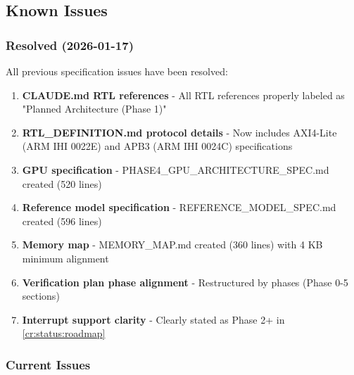 \subsection{Known Issues}\label{cr:status:phase-status:known-issues}

\subsubsection{\texorpdfstring{\ok{} Resolved
(2026-01-17)}{ Resolved (2026-01-17)}}\label{cr:status:phase-status:white-check-mark-resolved-2026-01-17}

\begin{record}

All previous specification issues have been resolved:

\begin{enumerate}
\def\labelenumi{\arabic{enumi}.}
\tightlist
\item
  \ok{} \textbf{CLAUDE.md RTL references} - All RTL references properly
  labeled as "Planned Architecture (Phase 1)"
\item
  \ok{} \textbf{RTL\_\allowbreak{}DEFINITION.md protocol details} - Now
  includes AXI4-Lite (ARM IHI 0022E) and APB3 (ARM IHI 0024C)
  specifications
\item
  \ok{} \textbf{GPU specification} -
  PHASE4\_\allowbreak{}GPU\_\allowbreak{}ARCHITECTURE\_\allowbreak{}SPEC.md
  created (520 lines)
\item
  \ok{} \textbf{Reference model specification} -
  REFERENCE\_\allowbreak{}MODEL\_\allowbreak{}SPEC.md created (596
  lines)
\item
  \ok{} \textbf{Memory map} - MEMORY\_\allowbreak{}MAP.md created (360
  lines) with 4 KB minimum alignment
\item
  \ok{} \textbf{Verification plan phase alignment} - Restructured by
  phases (Phase 0-5 sections)
\item
  \ok{} \textbf{Interrupt support clarity} - Clearly stated as Phase 2+
  in \cref{cr:status:roadmap}
\end{enumerate}

\end{record}

\subsubsection{\texorpdfstring{\wip{} Current Issues}{ Current Issues}}\label{cr:status:phase-status:arrows-counterclockwise-current-issues}

